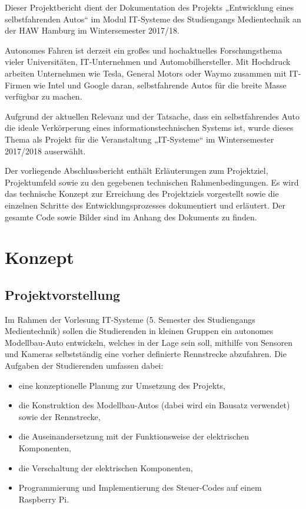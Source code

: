 \documentclass[a4paper, 12pt]{scrartcl}
\begin{document}
Dieser Projektbericht dient der Dokumentation des Projekts „Entwicklung eines selbstfahrenden Autos“ im Modul IT-Systeme des Studiengangs Medientechnik an der HAW Hamburg im Wintersemester 2017/18.

Autonomes Fahren ist derzeit ein großes und hochaktuelles Forschungsthema vieler Universitäten, IT-Unternehmen und Automobilhersteller. Mit Hochdruck arbeiten Unternehmen wie Tesla, General Motors oder Waymo zusammen mit IT-Firmen wie Intel und Google daran, selbstfahrende Autos für die breite Masse verfügbar zu machen.

Aufgrund der aktuellen Relevanz und der Tatsache, dass ein selbstfahrendes Auto die ideale Verkörperung eines informationstechnischen Systems ist, wurde dieses Thema als Projekt für die Veranstaltung „IT-Systeme“ im Wintersemester 2017/2018 auserwählt.

Der vorliegende Abschlussbericht enthält Erläuterungen zum Projektziel, Projektumfeld sowie zu den gegebenen technischen Rahmenbedingungen. Es wird das technische Konzept zur Erreichung des Projektziels vorgestellt sowie die einzelnen Schritte des Entwicklungsprozesses dokumentiert und erläutert. Der gesamte Code sowie Bilder sind im Anhang des Dokuments zu finden.

\section{Konzept}

\subsection{Projektvorstellung}

Im Rahmen der Vorlesung IT-Systeme (5. Semester des Studiengangs Medientechnik) sollen die Studierenden in kleinen Gruppen ein autonomes Modellbau-Auto entwickeln, welches in der Lage sein soll, mithilfe von Sensoren und Kameras selbstständig eine vorher definierte Rennstrecke abzufahren. Die Aufgaben der Studierenden umfassen dabei:

\begin{itemize}
	\item eine konzeptionelle Planung zur Umsetzung des Projekts,
	\item die Konstruktion des Modellbau-Autos (dabei wird ein Bausatz verwendet) sowie der Rennstrecke,
	\item die Auseinandersetzung mit der Funktionsweise der elektrischen Komponenten,
	\item die Verschaltung der elektrischen Komponenten,
	\item Programmierung und Implementierung des Steuer-Codes auf einem Raspberry Pi.
\end{itemize}
\end{document}
